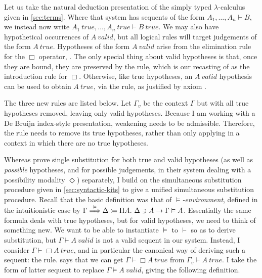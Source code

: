 Let us take the natural deduction presentation of the simply typed
$\lambda$-calculus given in \cref{sec:terms}.
Where that system has sequents of the form $A_1, \ldots, A_n \vdash B$, we
instead now write
$A_1~\mathit{true}, \ldots, A_n~\mathit{true} \vdash B~\mathit{true}$.
We may also have hypothetical occurrences of $A~\mathit{valid}$, but all logical
rules will target judgements of the form $A~\mathit{true}$.
Hypotheses of the form $A~\mathit{valid}$ arise from the elimination rule for
the $\Box$ operator, .
The only special thing about valid hypotheses is that, once they are bound, they
are preserved by the  rule, which is our recasting of
 as the introduction rule for $\Box$.
Otherwise, like true hypotheses, an $A~\mathit{valid}$ hypothesis can be used to
obtain $A~\mathit{true}$, via the  rule, as justified by axiom
.

The three new rules are listed below.
Let $\Gamma_v$ be the context $\Gamma$ but with all true hypotheses removed,
leaving only valid hypotheses.
Because I am working with a De Bruijn index-style presentation, weakening needs
to be admissible.
Therefore, the  rule needs to remove its true hypotheses,
rather than only applying in a context in which there are no true hypotheses.

\vspace{-2.5em}

Whereas \citet{judgmental} prove single substitution for both true and valid
hypotheses (as well as \emph{possible} hypotheses, and for possible judgements,
in their system dealing with a possibility modality $\Diamond$) separately, I
build on the simultaneous substitution procedure given in
\cref{sec:syntactic-kits} to give a unified simultaneous substitution procedure.
Recall that the basic definition was that of \emph{$\vDash$-environment},
defined in the intuitionistic case by
$\Gamma \stackrel{\vDash}\Longrightarrow \Delta \coloneqq \Pi A.~\Delta \ni A \to \Gamma \vDash A$.
Essentially the same formula deals with true hypotheses, but for valid
hypotheses, we need to think of something new.
We want to be able to instantiate $\vDash$ to $\vdash$ so as to derive
substitution, but $\Gamma \vdash A~\mathit{valid}$ is not a valid sequent in our
system.
Instead, I consider $\Gamma \vdash \Box A~\mathit{true}$, and in particular the
canonical way of deriving such a sequent: the  rule.
 says that we can get
$\Gamma \vdash \Box A~\mathit{true}$ from $\Gamma_v \vdash A~\mathit{true}$.
I take the form of latter sequent to replace $\Gamma \vDash A~\mathit{valid}$,
giving the following definition.

